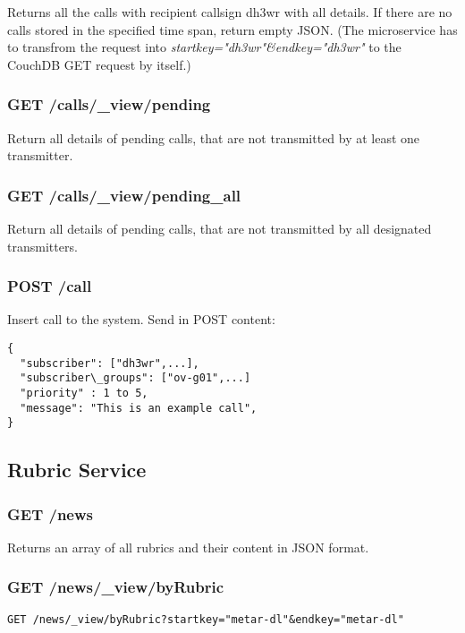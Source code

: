 Returns all the calls with recipient callsign dh3wr with all details. If there are no calls stored in the specified time span, return empty JSON. (The microservice has to transfrom the request into \textit{startkey="dh3wr"\&endkey="dh3wr"} to the CouchDB GET request by itself.)


\subsubsection{GET /calls/\_view/pending}

Return all details of pending calls, that are not transmitted by at least one transmitter.

\subsubsection{GET /calls/\_view/pending\_all}
Return all details of pending calls, that are not transmitted by all designated transmitters.

\subsubsection{POST /call}
Insert call to the system. Send in POST content:
\begin{lstlisting}
{
  "subscriber": ["dh3wr",...],
  "subscriber\_groups": ["ov-g01",...]
  "priority" : 1 to 5,
  "message": "This is an example call",
}
\end{lstlisting}

\subsection{Rubric Service}

\subsubsection{GET /news}
Returns an array of all rubrics and their content in JSON format.

\subsubsection{GET /news/\_view/byRubric}
\begin{verbatim}
GET /news/_view/byRubric?startkey="metar-dl"&endkey="metar-dl"
\end{verbatim}

